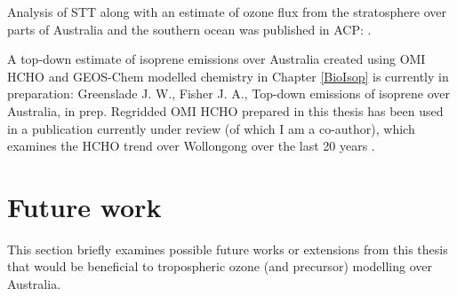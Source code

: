{  %
  Analysis of STT along with an estimate of ozone flux from the stratosphere over parts of Australia and the southern ocean was published in ACP: .
  
  A top-down estimate of isoprene emissions over Australia created using OMI HCHO and GEOS-Chem modelled chemistry in Chapter \ref{BioIsop} is currently in preparation: Greenslade J. W., Fisher J. A., Top-down emissions of isoprene over Australia, in prep.
  Regridded OMI HCHO prepared in this thesis has been used in a publication currently under review (of which I am a co-author), which examines the HCHO trend over Wollongong over the last 20 years .
  
  
\section{Future work}
  \label{Conclusions:futurework}
  
  This section briefly examines possible future works or extensions from this thesis that would be beneficial to tropospheric ozone (and precursor) modelling over Australia.
  
}

